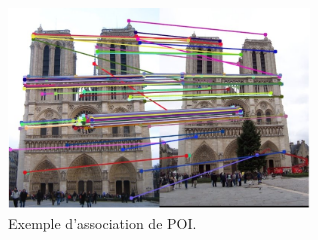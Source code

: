 \documentclass[11pt]{article}
\begin{document}
      \begin{figure}[hbt]  
        \centering
        \includegraphics[width=80mm]{AssociationPOI.png}    
        \caption{Exemple d'association de POI.}
        \label{fig:Appariement}
      \end{figure}   
    
    \clearpage
    \printnoidxglossary[type=acronym, nonumberlist]
    \printacronyms
 
\end{document}
